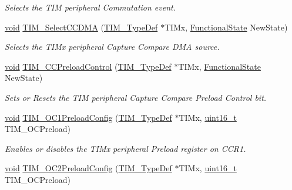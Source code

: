 \begin{DoxyCompactItemize}
\begin{DoxyCompactList}\small\item\em Selects the T\+IM peripheral Commutation event. \end{DoxyCompactList}\item 
\hyperlink{usb__devapi_8h_afabf60e7f57651d6d595a02c75f07cd0}{void} \hyperlink{group___t_i_m___exported___functions_ga5273cb65acb885fe7982827b1c6b7d75}{T\+I\+M\+\_\+\+Select\+C\+C\+D\+MA} (\hyperlink{struct_t_i_m___type_def}{T\+I\+M\+\_\+\+Type\+Def} $\ast$T\+I\+Mx, \hyperlink{agilefox_2library_2inc_2stm32f10x__type_8h_ac9a7e9a35d2513ec15c3b537aaa4fba1}{Functional\+State} New\+State)
\begin{DoxyCompactList}\small\item\em Selects the T\+I\+Mx peripheral Capture Compare D\+MA source. \end{DoxyCompactList}\item 
\hyperlink{usb__devapi_8h_afabf60e7f57651d6d595a02c75f07cd0}{void} \hyperlink{group___t_i_m___exported___functions_ga0a935254e44312b1d78e8684a58db3c1}{T\+I\+M\+\_\+\+C\+C\+Preload\+Control} (\hyperlink{struct_t_i_m___type_def}{T\+I\+M\+\_\+\+Type\+Def} $\ast$T\+I\+Mx, \hyperlink{agilefox_2library_2inc_2stm32f10x__type_8h_ac9a7e9a35d2513ec15c3b537aaa4fba1}{Functional\+State} New\+State)
\begin{DoxyCompactList}\small\item\em Sets or Resets the T\+IM peripheral Capture Compare Preload Control bit. \end{DoxyCompactList}\item 
\hyperlink{usb__devapi_8h_afabf60e7f57651d6d595a02c75f07cd0}{void} \hyperlink{group___t_i_m___exported___functions_ga60e6c29ad8f919bef616cf8e3306dd64}{T\+I\+M\+\_\+\+O\+C1\+Preload\+Config} (\hyperlink{struct_t_i_m___type_def}{T\+I\+M\+\_\+\+Type\+Def} $\ast$T\+I\+Mx, \hyperlink{_p_e___types_8h_a1f1825b69244eb3ad2c7165ddc99c956}{uint16\+\_\+t} T\+I\+M\+\_\+\+O\+C\+Preload)
\begin{DoxyCompactList}\small\item\em Enables or disables the T\+I\+Mx peripheral Preload register on C\+C\+R1. \end{DoxyCompactList}\item 
\hyperlink{usb__devapi_8h_afabf60e7f57651d6d595a02c75f07cd0}{void} \hyperlink{group___t_i_m___exported___functions_ga75b4614c6dd2cd52f2c5becdb6590c10}{T\+I\+M\+\_\+\+O\+C2\+Preload\+Config} (\hyperlink{struct_t_i_m___type_def}{T\+I\+M\+\_\+\+Type\+Def} $\ast$T\+I\+Mx, \hyperlink{_p_e___types_8h_a1f1825b69244eb3ad2c7165ddc99c956}{uint16\+\_\+t} T\+I\+M\+\_\+\+O\+C\+Preload)

\end{DoxyCompactItemize}
